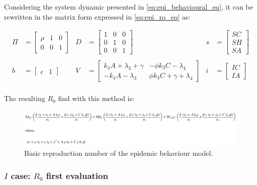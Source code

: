 Considering the system dynamic presented in \eqref{eq:epi_behavioural_eq}, it can be rewritten in the matrix form expressed in  \eqref{eq:epi_ro_eq} as: 

\begin{align*}
\Pi & = 
\begin{bmatrix}
	\rho & 1 & 0 \\
	0 & 0 & 1
\end{bmatrix} &
D & = 
\begin{bmatrix}
	1 & 0 & 0 \\
	0 & 1 & 0\\
	0 & 0 & 1
\end{bmatrix} & 
s & = 
\begin{bmatrix}
	SC \\
	SH\\
	SA 
\end{bmatrix} \\
\\
b & = \begin{bmatrix}
	\epsilon & 1
\end{bmatrix} & 
V & = 
\begin{bmatrix}
	k_4 A + \lambda_3 + \gamma & - \phi k_3  C - \lambda_4\\
	- k_4 A - \lambda_3 & \phi k_3 C + \gamma + \lambda_4
\end{bmatrix} & 
i & = 
\begin{bmatrix}
	IC \\
	IA
\end{bmatrix}
\\
\end{align*}


The resulting $R_0$ find with this method is: 
\begin{figure}
	\centering
	\includegraphics[width=0.99\linewidth]{1_corpo/figure/r0/ro_epidemic_behavioural}
	\caption[Reproduction number of epidemic behaviour model.]{Basic reproduction number of the epidemic behaviour model.}
	\label{fig:roepidemicbehavioural}
\end{figure}



\subsubsection{$I$ case: $R_0$ first evaluation}

